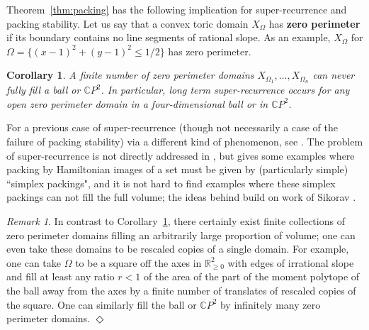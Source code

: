 \documentclass[11pt, reqno]{amsart}
\newtheorem{cor}[thm]{Corollary}
\theoremstyle{remark}
\numberwithin{equation}{subsection}
\numberwithin{figure}{section}
\theoremstyle{customremark}
\newtheorem{rmk_no_diamond}[thm]{Remark}
\newenvironment{rmk}{\begin{rmk_no_diamond} } {\hfill$\er$ \end{rmk_no_diamond}}
\newcommand{\er}{{\Diamond}}
\begin{document}
Theorem~\ref{thm:packing} has the following implication for super-recurrence and packing stability.   Let us say that a convex toric domain $X_{\Omega}$ has {\bf zero perimeter} if its boundary contains no line segments of rational slope.
As an example, $X_{\Omega}$ for $\Omega = \lbrace (x-1)^2 + (y-1)^2 \le 1/2 \rbrace$ has zero perimeter.
 
\begin{cor}
\label{cor:super}
A finite number of zero perimeter domains $X_{\Omega_1}, \ldots, X_{\Omega_n}$ can never fully fill a ball or $\mathbb{C}P^2$.  In particular, long term super-recurrence occurs for any open zero perimeter domain in a four-dimensional ball or in $\mathbb{C}P^2$.   
\end{cor}

For a previous case of super-recurrence (though not necessarily a case of the failure of packing stability) via a different kind of phenomenon, see \cite{traynorexper}.   
The problem of super-recurrence is not directly addressed in \cite{traynorexper}, but \cite[Thm. 1.1]{traynorexper} 
gives some examples where packing by Hamiltonian images of a set must be given by (particularly simple) ``simplex packings", and it is not hard to find examples where these simplex packings can not fill the full volume; the ideas behind \cite[Thm. 1.1]{traynorexper} build on work of Sikorav \cite{sikorav}.





 
\begin{rmk}
\label{rmk:example}
In contrast to Corollary~\ref{cor:super}, there certainly exist finite collections of zero perimeter domains filling an arbitrarily large proportion of volume; one can even take these domains to be rescaled copies of a single domain.  For example, one can take $\Omega$ to be a square off the axes in $\mathbb{R}^2_{\ge 0}$ with edges of irrational slope and fill at least any ratio $r < 1$ of the area of the part of the moment polytope of the ball away from the axes by a finite number of translates of rescaled copies of the square.  One can similarly fill the ball or $\mathbb{C}P^2$ by infinitely many zero perimeter domains.
 \end{rmk}
\end{document}
